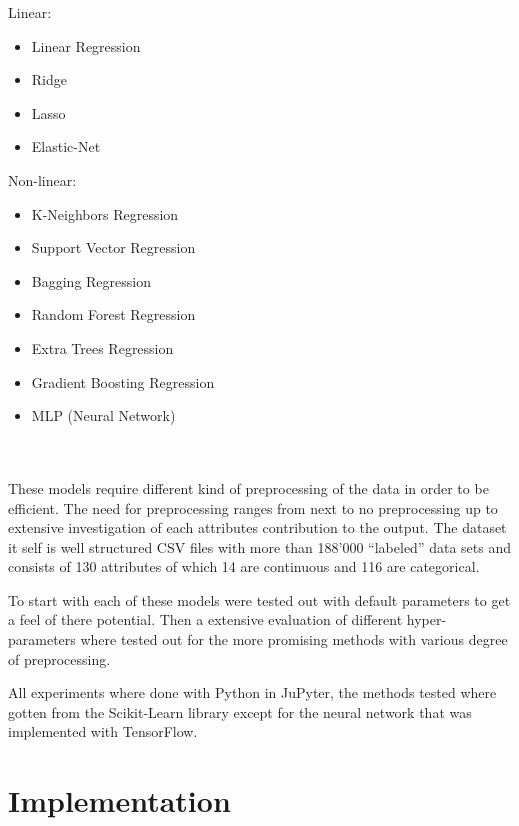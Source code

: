 \documentclass[a4paper]{article}
\begin{document}
\begin{varwidth}[t]{.5\textwidth}
    Linear:
    \begin{itemize}
        \item Linear Regression
        \item Ridge
        \item Lasso
        \item Elastic-Net
    \end{itemize}
\end{varwidth}
\hspace{4em}
\begin{varwidth}[t]{.5\textwidth}
    Non-linear:
    \begin{itemize}
        \item K-Neighbors Regression
        \item Support Vector Regression
        \item Bagging Regression
        \item Random Forest Regression
        \item Extra Trees Regression
        \item Gradient Boosting Regression
        \item MLP (Neural Network)
    \end{itemize}
\end{varwidth} \\\\
These models require different kind of preprocessing of the data in order to be efficient. The need for preprocessing ranges from next to no preprocessing up to extensive investigation of each attributes contribution to the output. The dataset it self is well structured CSV files with more than 188’000 “labeled” data sets and consists of 130 attributes of which 14 are continuous and 116 are categorical.

To start with each of these models were tested out with default parameters to get a feel of there potential. Then a extensive evaluation of different hyper-parameters where tested out for the more promising methods with various degree of preprocessing.

All experiments where done with Python in JuPyter, the methods tested where gotten from the Scikit-Learn library except for the neural network that was implemented with TensorFlow.


\section{Implementation}
\end{document}
